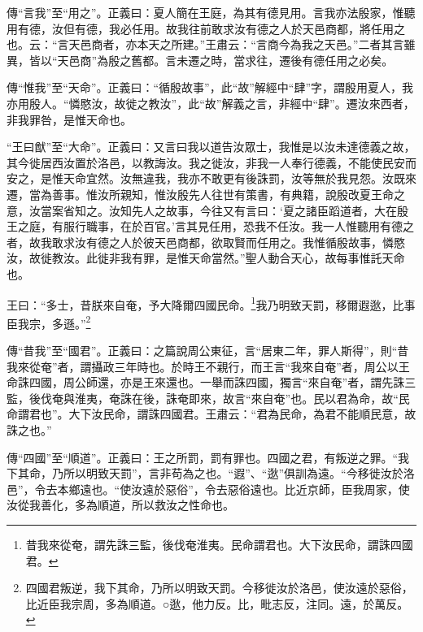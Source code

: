 {\noindent\zhuan{}\fzbyks 傳“言我”至“用之”。正義曰：夏人簡在王庭，為其有德見用。言我亦法殷家，惟聽用有德，汝但有德，我必任用。故我往前敢求汝有德之人於天邑商都，將任用之也。云：“言天邑商者，亦本天之所建。”王肅云：“言商今為我之天邑。”二者其言雖異，皆以“天邑商”為殷之舊都。言未遷之時，當求往，遷後有德任用之必矣。 \par}

{\noindent\zhuan{}\fzbyks 傳“惟我”至“天命”。正義曰：“循殷故事”，此“故”解經中“肆”字，謂殷用夏人，我亦用殷人。“憐愍汝，故徙之教汝”，此“故”解義之言，非經中“肆”。遷汝來西者，非我罪咎，是惟天命也。 \par}

{\noindent\shu{}\fzkt “王曰猷”至“大命”。正義曰：又言曰我以道告汝眾士，我惟是以汝未達德義之故，其今徙居西汝置於洛邑，以教誨汝。我之徙汝，非我一人奉行德義，不能使民安而安之，是惟天命宜然。汝無違我，我亦不敢更有後誅罰，汝等無於我見怨。汝既來遷，當為善事。惟汝所親知，惟汝殷先人往世有策書，有典籍，說殷改夏王命之意，汝當案省知之。汝知先人之故事，今往又有言曰：‘夏之諸臣蹈道者，大在殷王之庭，有服行職事，在於百官。’言其見任用，恐我不任汝。我一人惟聽用有德之者，故我敢求汝有德之人於彼天邑商都，欲取賢而任用之。我惟循殷故事，憐愍汝，故徙教汝。此徙非我有罪，是惟天命當然。”聖人動合天心，故每事惟託天命也。 \par}

王曰：“多士，昔朕來自奄，予大降爾四國民命。\footnote{昔我來從奄，謂先誅三監，後伐奄淮夷。民命謂君也。大下汝民命，謂誅四國君。}我乃明致天罰，移爾遐逖，比事臣我宗，多遜。”\footnote{四國君叛逆，我下其命，乃所以明致天罰。今移徙汝於洛邑，使汝遠於惡俗，比近臣我宗周，多為順道。○逖，他力反。比，毗志反，注同。遠，於萬反。}


{\noindent\zhuan{}\fzbyks 傳“昔我”至“國君”。正義曰：之篇說周公東征，言“居東二年，罪人斯得”，則“昔我來從奄”者，謂攝政三年時也。於時王不親行，而王言“我來自奄”者，周公以王命誅四國，周公師還，亦是王來還也。一舉而誅四國，獨言“來自奄”者，謂先誅三監，後伐奄與淮夷，奄誅在後，誅奄即來，故言“來自奄”也。民以君為命，故“民命謂君也”。大下汝民命，謂誅四國君。王肅云：“君為民命，為君不能順民意，故誅之也。” \par}

{\noindent\zhuan{}\fzbyks 傳“四國”至“順道”。正義曰：王之所罰，罰有罪也。四國之君，有叛逆之罪。“我下其命，乃所以明致天罰”，言非苟為之也。“遐”、“逖”俱訓為遠。“今移徙汝於洛邑”，令去本鄉遠也。“使汝遠於惡俗”，令去惡俗遠也。比近京師，臣我周家，使汝從我善化，多為順道，所以救汝之性命也。 \par}

